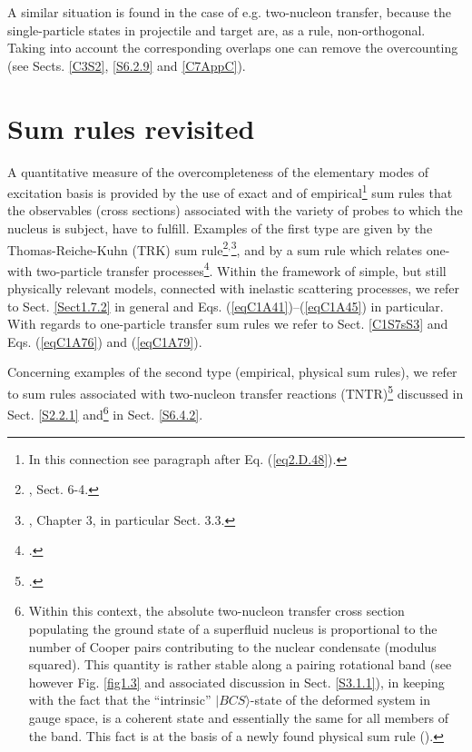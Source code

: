 A similar situation is found in the case of e.g. two-nucleon transfer, because the single-particle states in projectile and target are, as a rule, non-orthogonal. Taking into account the corresponding  overlaps one can remove the overcounting (see Sects. \ref{C3S2}, \ref{S6.2.9} and  \ref{C7AppC}).
\FloatBarrier

\section{Sum rules revisited}\label{C1S2}
A quantitative measure of the overcompleteness of  the elementary modes of excitation basis is provided by the use of exact and of empirical\footnote{In this connection see paragraph after Eq. (\ref{eq2.D.48}).}  sum rules that the observables (cross sections) associated with the variety of probes to which the nucleus is subject, have to fulfill. Examples of the first type are given by the Thomas-Reiche-Kuhn (TRK) sum rule\footnote{\cite{Bohr:75}, Sect. 6-4.}$^,$\footnote{\cite{Bertsch:05}, Chapter 3, in particular Sect. 3.3.}, and by a sum rule which relates one- with two-particle transfer processes\footnote{\cite{Bayman:72,Lanford:77}.}. Within the framework of simple, but still physically relevant models, connected with inelastic scattering processes, we refer to Sect. \ref{Sect1.7.2} in general and Eqs.  (\ref{eqC1A41})--(\ref{eqC1A45}) in particular. With regards to one-particle transfer sum rules we refer to Sect. \ref{C1S7sS3} and Eqs. (\ref{eqC1A76}) and (\ref{eqC1A79}).


 Concerning examples of the second type (empirical, physical sum rules), we refer to sum rules associated with two-nucleon transfer reactions (TNTR)\footnote{\cite{Broglia:72b}.} discussed in Sect. \ref{S2.2.1} and\footnote{Within this context, the absolute two-nucleon transfer cross section populating the ground state of a superfluid nucleus is proportional to the number of Cooper pairs 
 	 contributing to the nuclear condensate (modulus squared). This quantity is rather stable along a pairing rotational band (see however Fig. \ref{fig1.3} and associated discussion in Sect. \ref{S3.1.1}), in keeping with the fact that the ``intrinsic'' $|BCS\rangle$-state of the deformed system in gauge space, is a coherent state and essentially the same for all members of the band. This fact is at the basis of a newly found physical sum rule \mbox{(\cite{Potel:17})}.  } in Sect. \ref{S6.4.2}.












